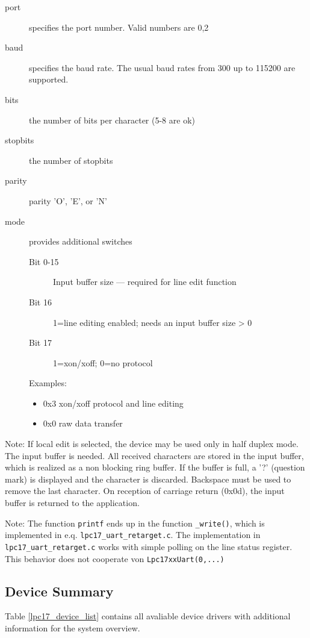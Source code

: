 \begin{description}
\item [port] specifies the port number. Valid numbers are 0,2
\item[baud] specifies the baud rate. The usual baud rates from 300 up to 115200 are supported.
\item[bits] the number of bits per character (5-8 are ok)
\item[stopbits] the number of stopbits
\item[parity] parity 'O', 'E', or 'N'
\item[mode] provides additional switches
   \begin{description}
   \item[Bit 0-15] Input buffer size --- required for line edit function
   \item [Bit 16] 1=line editing enabled; needs an input buffer size > 0
   \item [Bit 17] 1=xon/xoff; 0=no protocol
   \end{description}
   Examples:
   \begin{itemize}
   \item  0x3 xon/xoff protocol and line editing
   \item  0x0 raw data transfer
   \end{itemize}
\end{description}
 
Note: If local edit is selected, the device may be used only in 
half duplex mode. The input buffer is needed.
All received characters are stored in the input buffer, which is 
realized as a non blocking ring buffer. If the buffer is full, a  '?'
(question mark) is displayed and the character is discarded. Backspace 
must be used to remove the last character.
On reception of carriage return (0x0d), the input buffer is returned to 
the application.

Note: The function \verb|printf| ends up in the function \verb|_write()|, which
is implemented in e.q. \verb|lpc17_uart_retarget.c|. The implementation
in \verb|lpc17_uart_retarget.c| works with simple polling on the line status
register. This behavior does not cooperate von \verb|Lpc17xxUart(0,...)|

\subsection{Device Summary}
Table \ref{lpc17_device_list} contains all avaliable device drivers 
with additional information for the system overview.


